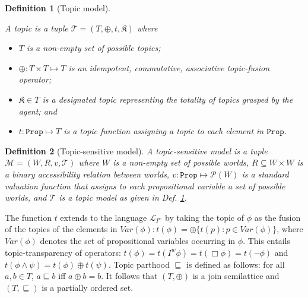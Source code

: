 \documentclass{article}
\newtheorem{defi}{Definition}
\begin{document}
\begin{defi}[Topic model]
\label{topicmodel}

A topic is a tuple $\mathcal{T} = (T, \oplus, t, \mathfrak{K})$ where

\begin{itemize}

\item $T$ is a non-empty set of possible topics;

\item $\oplus: T \times T \mapsto T$ is an idempotent, commutative, associative topic-fusion operator;

\item $\mathfrak{K} \in T$ is a designated topic representing the totality of topics grasped by the agent; and

\item $t: \mathtt{Prop} \mapsto T$ is a topic function assigning a topic to each element in $\mathtt{Prop}$.

\end{itemize}

\end{defi}


\begin{defi}[Topic-sensitive model]

A topic-sensitive model is a tuple $\mathcal{M} = (W, R, v, \mathcal{T})$ where $W$ is a non-empty set of possible worlds, $R \subseteq W \times W$ is a binary accessibility relation between worlds, $v: \mathtt{Prop} \mapsto \mathcal{P}(W)$ is a standard valuation function that assigns to each propositional variable a set of possible worlds, and $\mathcal{T}$ is a topic model as given in Def. \ref{topicmodel}.


\end{defi}

The function $t$ extends to the language $\mathcal{L}_{I^{w}}$ by taking the topic of $\phi$ as the fusion of the topics of the elements in $Var(\phi): t(\phi) = \oplus \{t(p): p \in Var(\phi)\}$, where $Var(\phi)$ denotes the set of propositional variables occurring in $\phi$. This entails topic-transparency of operators: $t(\phi) = t(I^{w}\phi) = t(\Box \phi) = t(\neg \phi)$ and $t(\phi \wedge \psi) = t(\phi) \oplus t(\psi)$. Topic parthood $\sqsubseteq$ is defined as follows: for all $a, b \in T$, $a \sqsubseteq b$ iff $a \oplus b = b$. It follows that $(T, \oplus)$ is a join semilattice and $(T, \sqsubseteq)$ is a partially ordered set.
\end{document}
